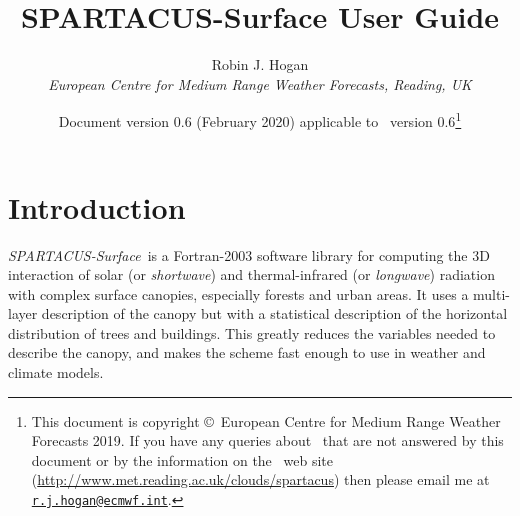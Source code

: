 \documentclass[a4,oneside]{article}
\title{SPARTACUS-Surface User Guide}
\author{Robin J. Hogan\\ \emph{European Centre for Medium Range
    Weather Forecasts, Reading, UK}}
\date{Document version 0.6 (February 2020) applicable to
  \spsurf\ version 0.6\thanks{This document is copyright
    \copyright\ European Centre for Medium Range Weather Forecasts
    2019. If you have any queries about \spsurf\ that are not
    answered by this document or by the information on the \spsurf\ web
    site
    (\url{http://www.met.reading.ac.uk/clouds/spartacus})
    then please email me at
    \href{mailto:r.j.hogan@ecmwf.int}{\texttt{r.j.hogan@ecmwf.int}}.}}
\def\spsurf{\emph{SPARTACUS-Surface}}
\renewcommand\thefootnote{\relax}
\def\chapter{\section}
\begin{document}
\maketitle

\def\thefootnote{\fnsymbol{footnote}}
\chapter{Introduction}
\spsurf\ is a Fortran-2003 software library for computing the 3D
interaction of solar (or \emph{shortwave}) and thermal-infrared (or
\emph{longwave}) radiation with complex surface canopies, especially
forests and urban areas. It uses a multi-layer description of the
canopy but with a statistical description of the horizontal
distribution of trees and buildings. This greatly reduces the
variables needed to describe the canopy, and makes the scheme fast
enough to use in weather and climate models.
\end{document}
